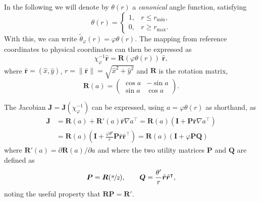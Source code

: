 \documentclass[onecolumn, twoside, a4paper, 11pt]{article}
\begin{document}
In the following we will denote by $\theta(r)$ a \emph{canonical} angle
function, satisfying
\[
  \theta(r) = \begin{cases}
    1, & r \le r_\text{min}, \\
    0, & r \ge r_\text{max}.
  \end{cases}
\]
With this, we can write $\tilde{\theta}_\varphi(r) = \varphi \theta(r)$.
The mapping from reference coordinates to physical coordinates can then be
expressed as
\[
  \chi_{\varphi}^{-1} \hat{\bm r}
  = \bm R(\varphi \theta(r)) \; \hat{\bm r},
\]
where $\hat{\bm r} = \left( \hat{x}, \hat{y} \right)$,
$r = \| \hat{\bm r} \| = \sqrt{\hat{x}^2 + \hat{y}^2}$
and $\bm R$ is the rotation matrix,
\[
  \bm R(a) = \begin{pmatrix} \cos a & - \sin a \\ \sin a & \cos a \end{pmatrix}.
\]

The Jacobian $\bm J = \bm J(\chi_{\varphi}^{-1})$ can be expressed,
using $a = \varphi \theta(r)$ as shorthand, as
\begin{align}
  \nonumber
  \bm J &= \bm R(a) + \bm R'(a) \hat{\bm r} \nabla a^\intercal
  = \bm R(a) \left( \bm I + \bm P \hat{\bm r} \nabla a^\intercal \right) \\
  &= \bm R(a) \left(
    \bm I + \frac{\varphi \theta'}{r} \bm P \hat{\bm r} \hat{\bm r}^\intercal
  \right)
  = \bm R(a) \left( \bm I + \varphi \bm P \bm Q \right)
\end{align}
where $\bm R'(a) = \partial \bm R(a) / \partial a$ and
where the two utility matrices $\bm P$ and $\bm Q$ are defined as
\begin{equation}
  \bm P = \bm R(\nicefrac{\pi}{2}), \qquad
  \bm Q = \frac{\theta'}{r} \hat{\bm r} \hat{\bm r}^\intercal,
\end{equation}
noting the useful property that $\bm R \bm P = \bm R'$.
\end{document}
